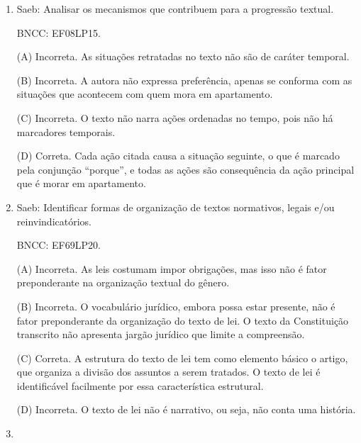 \begin{enumerate}
(C) Incorreta. A língua do cotidiano é governada por regras tanto quanto
a língua ensinada na escola, porém são regras diferentes baseadas em
critérios diferentes, às vezes não conscientes, como no caso da língua
cotidiana.

(D) Correta. O autor diferencia as regras linguísticas ensinadas na
escola (norma-padrão) do uso real do português. Segundo ele, as pessoas
não fazem essa distinção e acabam afirmando levianamente que o português
é difícil, porque reduzem a língua, em todos os seus usos, àquela
modalidade ensinada na escola.


\item

Saeb: Analisar os mecanismos que contribuem para a progressão textual.

BNCC: EF08LP15.

(A) Incorreta. As situações retratadas no texto não são de caráter
temporal.

(B) Incorreta. A autora não expressa preferência, apenas se conforma com
as situações que acontecem com quem mora em apartamento.

(C) Incorreta. O texto não narra ações ordenadas no tempo, pois não há
marcadores temporais.

(D) Correta. Cada ação citada causa a situação seguinte, o que é marcado
pela conjunção ``porque'', e todas as ações são consequência da ação
principal que é morar em apartamento.


\item

Saeb: Identificar formas de organização de textos normativos, legais
e/ou reinvindicatórios.

BNCC: EF69LP20.

(A) Incorreta. As leis costumam impor obrigações, mas isso não é fator
preponderante na organização textual do gênero.

(B) Incorreta. O vocabulário jurídico, embora possa estar presente, não
é fator preponderante da organização do texto de lei. O texto da
Constituição transcrito não apresenta jargão jurídico que limite a
compreensão.

(C) Correta. A estrutura do texto de lei tem como elemento básico o
artigo, que organiza a divisão dos assuntos a serem tratados. O texto de
lei é identificável facilmente por essa característica estrutural.

(D) Incorreta. O texto de lei não é narrativo, ou seja, não conta uma
história.

\item


\end{enumerate}
